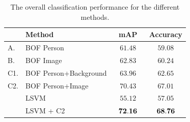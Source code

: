 \documentclass{bmvc2k}
\newcommand{\red}[1]{{\em \small \color{red} #1}} %
\newcommand{\tfs}{\small}   %
\newcommand{\cfs}{\small}   %
\begin{document}

\begin{table}[tbp]
\centering
{}
\begin{tabular}{|l|l||c|c|}
\hline
& \tfs Method                   &\tfs$~~~$mAP$~~~$& \tfs Accuracy  \\ \hline 
\tfs A.   & \tfs BOF Person          & \tfs $61.48$ & \tfs $59.08$ \\ \hline 
\tfs B.   & \tfs BOF Image           & \tfs $62.83$ & \tfs $60.24 $ \\ \hline 
\tfs C1. & \tfs BOF Person+Background& \tfs $63.96$ & \tfs $62.65$ \\ \hline 
\tfs C2. & \tfs BOF Person+Image     & \tfs $70.43$ & \tfs $67.01$ \\ \hline \hline
       & \tfs LSVM              & \tfs $55.12$ & \tfs $57.05$   \\ \hline \hline 
       & \tfs LSVM +  C2    & \tfs ${\bf 72.16}$ & \tfs ${\bf 68.76}$   \\ \hline 
\end{tabular}
\vspace{2mm}
\caption{\cfs The overall classification performance for the different methods. \normalsize}
\label{tab:methods}
\end{table}
\end{document}
